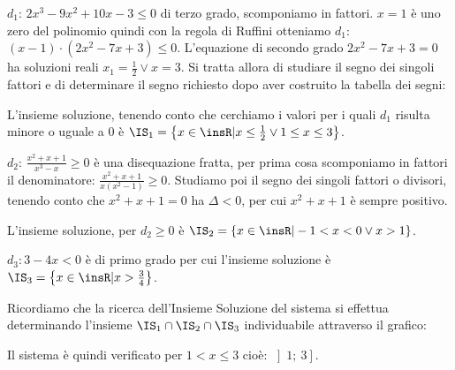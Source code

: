\begin{itemize*}
\item $d_1$: $2x^3-9x^2+10x-3\le 0$ di terzo grado, scomponiamo in fattori. 
$x=1$ è uno zero del polinomio quindi con la regola di Ruffini otteniamo $d_1$: 
$(x-1)\cdot (2x^2-7x+3)\le 0$. L'equazione di secondo grado $2x^2-7x+3=0$ ha 
soluzioni reali $x_1=\frac 1 2\vee x=3$. Si tratta allora di studiare il segno 
dei singoli fattori e di determinare il segno richiesto dopo aver costruito la 
tabella dei segni:
\begin{center}
 
\end{center}
L'insieme soluzione, tenendo conto che cerchiamo i valori per i quali $d_1$ 
risulta minore o uguale a $0$ è $\IS_1=\left\{x\in \insR | x\le\frac 1 2\vee 
1\le x\le 3\right\}$.

\item $d_2$: $\frac{x^2+x+1}{x^3-x}\ge 0$ è una disequazione fratta, per prima 
cosa scomponiamo in fattori il denominatore: $\frac{x^2+x+1}{x(x^2-1)}\ge 0$.
Studiamo poi il segno dei singoli fattori o divisori, tenendo conto che 
$x^2+x+1=0$ ha $\Delta <0$, per cui $x^2+x+1$ è sempre positivo.
\begin{center}
 
\end{center}
L'insieme soluzione, per $d_2\ge 0$ è $\IS_2=\left\{x\in \insR | -1<x<0\vee 
x>1\right\}$.
\item $d_3:3-4x<0$ è di primo grado per cui l'insieme soluzione è 
$\IS_3=\left\{x\in \insR | x>\frac 3 4\right\}$.
\end{itemize*}
Ricordiamo che la ricerca dell'Insieme Soluzione del sistema si effettua 
determinando l'insieme $\IS_1\cap \IS_2\cap \IS_3$ individuabile attraverso il 
grafico:
\begin{center}
 
\end{center}
Il sistema è quindi verificato per $1<x\le 3$  cioè: $ \left] 1;~3 \right]$.

